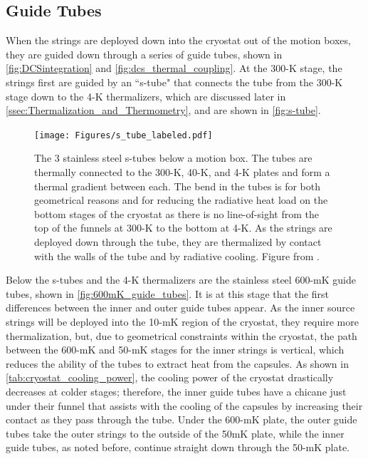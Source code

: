 \subsection*{Guide Tubes}
\label{ssec:Guide Tubes}
When the strings are deployed down into the cryostat out of the motion boxes, they are guided down through a series of guide tubes, shown in \autoref{fig:DCSintegration} and \autoref{fig:dcs_thermal_coupling}.
At the 300-K stage, the strings first are guided by an ``s-tube" that connects the tube from the 300-K stage down to the 4-K thermalizers, which are discussed later in \autoref{ssec:Thermalization_and_Thermometry}, and are shown in \autoref{fig:s-tube}.
\begin{figure}[htbp]
    \centering
    \texttt{[image: Figures/s\_tube\_labeled.pdf]}
    \caption[The 3 stainless steel s-tubes below a motion box]
    {The 3 stainless steel s-tubes below a motion box.
    The tubes are thermally connected to the 300-K, 40-K, and 4-K plates and form a thermal gradient between each.
    The bend in the tubes is for both geometrical reasons and for reducing the radiative heat load on the bottom stages of the cryostat as there is no line-of-sight from the top of the funnels at 300-K to the bottom at 4-K.
    As the strings are deployed down through the tube, they are thermalized by contact with the walls of the tube and by radiative cooling.
    Figure from \cite{Cushman:2016cnv}.}
    \label{fig:s-tube}
\end{figure}
Below the s-tubes and the 4-K thermalizers are the stainless steel 600-mK guide tubes, shown in \autoref{fig:600mK_guide_tubes}.
It is at this stage that the first differences between the inner and outer guide tubes appear.
As the inner source strings will be deployed into the 10-mK region of the cryostat, they require more thermalization, but, due to geometrical constraints within the cryostat, the path between the 600-mK and 50-mK stages for the inner strings is vertical, which reduces the ability of the tubes to extract heat from the capsules.
As shown in \autoref{tab:cryostat_cooling_power}, the cooling power of the cryostat drastically decreases at colder stages; therefore, the inner guide tubes have a chicane just under their funnel that assists with the cooling of the capsules by increasing their contact as they pass through the tube.
Under the 600-mK plate, the outer guide tubes take the outer strings to the outside of the 50mK plate, while the inner guide tubes, as noted before, continue straight down through the 50-mK plate.
